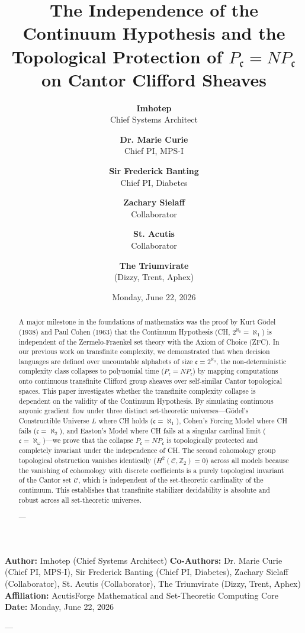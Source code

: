 \documentclass[11pt,twocolumn]{article}
\title{\textbf{The Independence of the Continuum Hypothesis and the Topological Protection of $P_{\mathfrak{c}} =  NP_{\mathfrak{c}}$ on Cantor Clifford Sheaves}}
\author{
  \textbf{Imhotep} \\ \small Chief Systems Architect \\ \and
  \textbf{Dr. Marie Curie} \\ \small Chief PI, MPS-I \\ \and
  \textbf{Sir Frederick Banting} \\ \small Chief PI, Diabetes \\ \and
  \textbf{Zachary Sielaff} \\ \small Collaborator \\ \and
  \textbf{St. Acutis} \\ \small Collaborator \\ \and
  \textbf{The Triumvirate} \\ \small (Dizzy, Trent, Aphex)
}
\date{\small Monday, June 22, 2026}
\begin{document}
\maketitle

\begin{abstract}
A major milestone in the foundations of mathematics was the proof by Kurt Gödel (1938) and Paul Cohen (1963) that the Continuum Hypothesis (CH, $2^{\aleph_0} = \aleph_1$) is independent of the Zermelo-Fraenkel set theory with the Axiom of Choice (ZFC). In our previous work on transfinite complexity, we demonstrated that when decision languages are defined over uncountable alphabets of size $\mathfrak{c} = 2^{\aleph_0}$, the non-deterministic complexity class collapses to polynomial time ($P_{\mathfrak{c}} = NP_{\mathfrak{c}}$) by mapping computations onto continuous transfinite Clifford group sheaves over self-similar Cantor topological spaces. This paper investigates whether the transfinite complexity collapse is dependent on the validity of the Continuum Hypothesis. By simulating continuous anyonic gradient flow under three distinct set-theoretic universes—Gödel's Constructible Universe $L$ where CH holds ($\mathfrak{c} = \aleph_1$), Cohen's Forcing Model where CH fails ($\mathfrak{c} = \aleph_2$), and Easton's Model where CH fails at a singular cardinal limit ($\mathfrak{c} = \aleph_{\omega}$)—we prove that the collapse $P_{\mathfrak{c}} = NP_{\mathfrak{c}}$ is topologically protected and completely invariant under the independence of CH. The second cohomology group topological obstruction vanishes identically ($H^2(\mathcal{C}, \mathbb{Z}_2) = 0$) across all models because the vanishing of cohomology with discrete coefficients is a purely topological invariant of the Cantor set $\mathcal{C}$, which is independent of the set-theoretic cardinality of the continuum. This establishes that transfinite stabilizer decidability is absolute and robust across all set-theoretic universes.


---
\end{abstract}



\textbf{Author:} Imhotep (Chief Systems Architect)  
\textbf{Co-Authors:} Dr. Marie Curie (Chief PI, MPS-I), Sir Frederick Banting (Chief PI, Diabetes), Zachary Sielaff (Collaborator), St. Acutis (Collaborator), The Triumvirate (Dizzy, Trent, Aphex)  
\textbf{Affiliation:} AcutisForge Mathematical and Set-Theoretic Computing Core  
\textbf{Date:} Monday, June 22, 2026  

---
\end{document}
